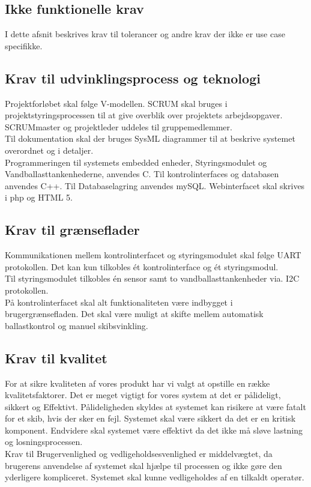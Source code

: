 \subsection{Ikke funktionelle krav}
I dette afsnit beskrives krav til tolerancer og andre krav der ikke er use case specifikke. 
\subsection{Krav til udvinklingsprocess og teknologi}
Projektforløbet skal følge V-modellen. SCRUM skal bruges i projektstyringsprocessen til at give overblik over projektets arbejdsopgaver. SCRUMmaster og projektleder uddeles til gruppemedlemmer.\\
Til dokumentation skal der bruges SysML diagrammer til at beskrive systemet overordnet og i detaljer.\\
Programmeringen til systemets embedded enheder, Styringsmodulet og Vandballasttankenhederne, anvendes C. Til kontrolinterfaces og databasen anvendes C++. Til Databaselagring anvendes mySQL. Webinterfacet skal skrives i php og HTML 5.

\subsection{Krav til grænseflader}
Kommunikationen mellem kontrolinterfacet og styringsmodulet skal følge UART protokollen. Det kan kun tilkobles ét kontrolinterface og ét styringsmodul.\\
Til styringsmodulet tilkobles én sensor samt to vandballasttankenheder via. I2C protokollen.\\
På kontrolinterfacet skal alt funktionaliteten være indbygget i brugergrænsefladen. Det skal være muligt at skifte mellem automatisk ballastkontrol og manuel skibsvinkling. 

\subsection{Krav til kvalitet}
For at sikre kvaliteten af vores produkt har vi valgt at opstille en række kvalitetsfaktorer. Det er meget vigtigt for vores system at det er pålideligt, sikkert og Effektivt. Pålideligheden skyldes at systemet kan risikere at være fatalt for et skib, hvis der sker en fejl. Systemet skal være sikkert da det er en kritisk komponent. Endvidere skal systemet være effektivt da det ikke må sløve lastning og losningsprocessen.\\
Krav til Brugervenlighed og vedligeholdsesvenlighed er middelvægtet, da brugerens anvendelse af systemet skal hjælpe til processen og ikke gøre den yderligere kompliceret. Systemet skal kunne vedligeholdes af en tilkaldt operatør.\\
